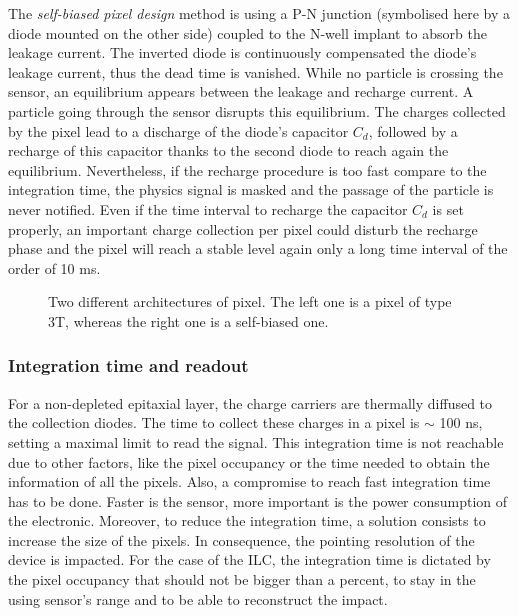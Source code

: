     The \textit{self-biased pixel design} method is using a P-N junction (symbolised here by a diode mounted on the other side) coupled to the N-well implant to absorb the leakage current.
    The inverted diode is continuously compensated the diode's leakage current, thus the dead time is vanished.
    While no particle is crossing the sensor, an equilibrium appears between the leakage and recharge current.
    A particle going through the sensor disrupts this equilibrium.
    The charges collected by the pixel lead to a discharge of the diode's capacitor $C_d$, followed by a recharge of this capacitor thanks to the second diode to reach again the equilibrium.
    Nevertheless, if the recharge procedure is too fast compare to the integration time, the physics signal is masked and the passage of the particle is never notified.
    Even if the time interval to recharge the capacitor $C_d$ is set properly, an important charge collection per pixel could disturb the recharge phase and the pixel will reach a stable level again only a long time interval of the order of 10 ms.

    \begin{figure}[!h]
      \caption{Two different architectures of pixel. The left one is a pixel of type 3T, whereas the right one is a self-biased one.}
      \label{fig:elecArch}
    \end{figure}

    \subsubsection{Integration time and readout}

    For a non-depleted epitaxial layer, the charge carriers are thermally diffused to the collection diodes.
    The time to collect these charges in a pixel is $\sim$ 100 ns, setting a maximal limit to read the signal.
    This integration time is not reachable due to other factors, like the pixel occupancy or the time needed to obtain the information of all the pixels.
    Also, a compromise to reach fast integration time has to be done.
    Faster is the sensor, more important is the power consumption of the electronic.
    Moreover, to reduce the integration time, a solution consists to increase the size of the pixels.
    In consequence, the pointing resolution of the device is impacted.
    For the case of the \gls{ILC}, the integration time is dictated by the pixel occupancy that should not be bigger than a percent, to stay in the using sensor's range and to be able to reconstruct the impact.

